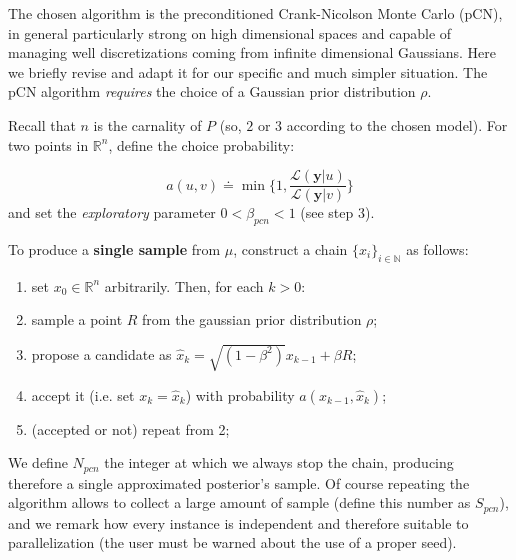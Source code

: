 \documentclass[8pt]{article}
\begin{document}
The chosen algorithm is the preconditioned Crank-Nicolson
Monte Carlo (pCN), in general particularly strong on high
dimensional spaces and capable of managing well discretizations
coming from infinite dimensional Gaussians.
Here we briefly revise and adapt it for our specific
and much simpler situation. The pCN algorithm \emph{requires}
the choice of a Gaussian prior distribution $\rho$.


Recall that $n$ is the carnality of $P$ (so, $2$ or $3$
according to the chosen model). For two points in $\mathbb{R}^n$,
define the choice probability:

\begin{equation}
	a(u, v) \doteq \min \{ 1, \frac{ \mathcal{L}(\textbf{y} | u )}
				{\mathcal{L}(\textbf{y} | v)} \}
\end{equation}
and set the \emph{exploratory} parameter $0 < \beta_{pcn} < 1$ 
(see step 3).


To produce a \textbf{single sample} from $\mu$, construct a chain 
$\{ x_i \} _{i \in \mathbb{N} }$ as follows:

\begin{enumerate}
	\item set $x_0 \in \mathbb{R}^n$ arbitrarily. Then, for each
		$k > 0$:
	\item sample a point $R$ from the gaussian prior distribution $\rho$;

	\item  propose a candidate as 
		$
		\hat{x}_{k} = \sqrt{(1 - \beta^2)} x_{k-1}
			+ \beta R
		$;
	\item	accept it (i.e. set $x_{k} = \hat{x}_{k}$)
		with probability $a(x_{k-1}, \hat{x}_k)$;
	\item (accepted or not) repeat from 2;
\end{enumerate}
We define $N_{pcn}$ the integer at which we always stop the chain,
producing therefore a single approximated posterior's sample.
Of course repeating the algorithm allows to collect 
a large amount of sample (define this number as $S_{pcn}$),
and we remark how every instance is
independent and therefore suitable to parallelization
(the user must be warned about the use of a proper seed).
\end{document}
